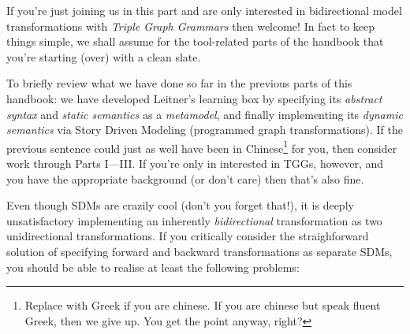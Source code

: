 If you're just joining us in this part and are only interested in bidirectional model transformations with \emph{Triple Graph Grammars} then welcome! 
In fact to keep things simple, we shall assume for the tool-related parts of the handbook that you're starting (over) with a clean slate. 

To briefly review what we have done so far in the previous parts of this handbook: we have developed Leitner's learning box by specifying its \emph{abstract syntax} and \emph{static semantics} as a
\emph{metamodel}, and finally implementing its \emph{dynamic semantics} via Story Driven Modeling (programmed graph transformations). If the previous sentence
could just as well have been in Chinese\footnote{Replace with Greek if you are chinese.  If you are chinese but speak fluent Greek, then we give up. You get the
point anyway, right?} for you, then consider work through Parts I---III.
If you're only in interested in TGGs, however, and you have the appropriate background (or don't care) then that's also fine.

Even though SDMs are crazily cool (don't you forget that!), it is deeply unsatisfactory implementing an inherently \emph{bidirectional} transformation as two unidirectional transformations. 
If you critically consider the straighforward solution of specifying forward and backward transformations as separate SDMs, you should be able to realise at least the following problems:

\vspace{-0.5cm}

